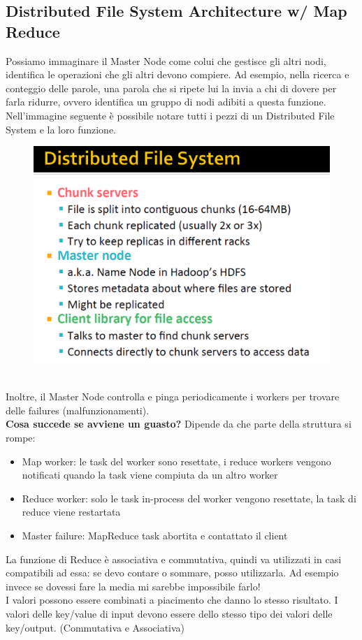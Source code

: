 \newpage

\subsection{Distributed File System Architecture w/ Map Reduce}

Possiamo immaginare il Master Node come colui che gestisce gli altri nodi, identifica le operazioni che gli altri devono compiere. Ad esempio, nella ricerca e conteggio delle parole, una parola che si ripete lui la invia a chi di dovere per farla ridurre, ovvero identifica un gruppo di nodi adibiti a questa funzione. Nell'immagine seguente è possibile notare tutti i pezzi di un Distributed File System e la loro funzione. 
\\
\begin{figure}[th]
    \centering
    \includegraphics[scale=0.4]{MapReduce/img/DFS.png}
    \label{fig:DFS}
\end{figure}
\\
Inoltre, il Master Node controlla e pinga periodicamente i workers per trovare delle failures (malfunzionamenti).
\\
\textbf{Cosa succede se avviene un guasto?} Dipende da che parte della struttura si rompe:
\begin{itemize}
    \item Map worker: le task del worker sono resettate, i reduce workers vengono notificati quando la task viene compiuta da un altro worker
    \item Reduce worker: solo le task in-process del worker vengono resettate, la task di reduce viene restartata
    \item Master failure: MapReduce task abortita e contattato il client
\end{itemize}
La funzione di Reduce è associativa e commutativa, quindi va utilizzati in casi compatibili ad essa: se devo contare o sommare, posso utilizzarla. Ad esempio invece se dovessi fare la media mi sarebbe impossibile farlo! 
\\
I valori possono essere combinati a piacimento che danno lo stesso risultato. I valori delle key/value di input devono essere dello stesso tipo dei valori delle key/output. (Commutativa e Associativa)
\newpage
